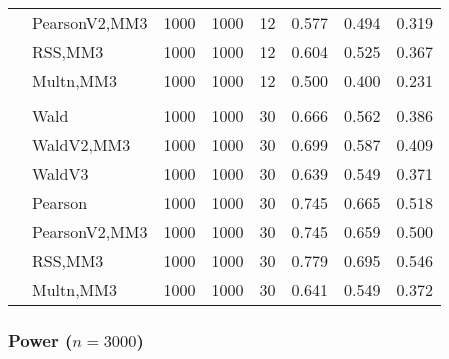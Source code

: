 \documentclass[
]{article}
\begin{document}
\begin{table}[H]
{\begin{tabular}[t]{llrrrrrr}
\hspace{1em} & PearsonV2,MM3 & 1000 & 1000 & 12 & 0.577 & 0.494 & 0.319\\

\hspace{1em} & RSS,MM3 & 1000 & 1000 & 12 & 0.604 & 0.525 & 0.367\\

\hspace{1em} & Multn,MM3 & 1000 & 1000 & 12 & 0.500 & 0.400 & 0.231\\
\cmidrule{1-8}
\addlinespace[0.3em]
\multicolumn{8}{l}{\textbf{3F 15V}}\\
\hspace{1em} & Wald & 1000 & 1000 & 30 & 0.666 & 0.562 & 0.386\\

\hspace{1em} & WaldV2,MM3 & 1000 & 1000 & 30 & 0.699 & 0.587 & 0.409\\

\hspace{1em} & WaldV3 & 1000 & 1000 & 30 & 0.639 & 0.549 & 0.371\\

\hspace{1em} & Pearson & 1000 & 1000 & 30 & 0.745 & 0.665 & 0.518\\

\hspace{1em} & PearsonV2,MM3 & 1000 & 1000 & 30 & 0.745 & 0.659 & 0.500\\

\hspace{1em} & RSS,MM3 & 1000 & 1000 & 30 & 0.779 & 0.695 & 0.546\\

\hspace{1em} & Multn,MM3 & 1000 & 1000 & 30 & 0.641 & 0.549 & 0.372\\
\bottomrule
\end{tabular}}
\end{table}

\hypertarget{power-n3000}{%
\subsubsection{\texorpdfstring{Power
(\(n=3000\))}{Power (n=3000)}}\label{power-n3000}}
\end{document}

